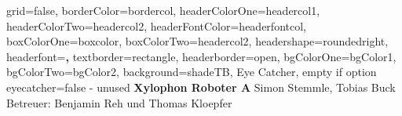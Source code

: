 \documentclass[a0paper,portrait]{baposter}
\begin{document}


\begin{poster}{
	grid=false,
	borderColor=bordercol,
	headerColorOne=headercol1,
	headerColorTwo=headercol2,
	headerFontColor=headerfontcol,
	boxColorOne=boxcolor,
	boxColorTwo=headercol2,
	headershape=roundedright,
	headerfont=\Large\sf\textbf,
	textborder=rectangle,
	headerborder=open,
	bgColorOne=bgColor1,
	bgColorTwo=bgColor2,
	background=shadeTB,
}
{
	Eye Catcher, empty if option eyecatcher=false - unused
}
{\sf\textbf{
	Xylophon Roboter A}
}
{
	\vspace{1em} Simon Stemmle, Tobias Buck\\
	{\smaller Betreuer: Benjamin Reh und Thomas Kloepfer}
}
{
\hspace{-3.5cm}
\setlength\fboxsep{0pt}
\setlength\fboxrule{0.5pt}
}


\end{poster}
\end{document}
